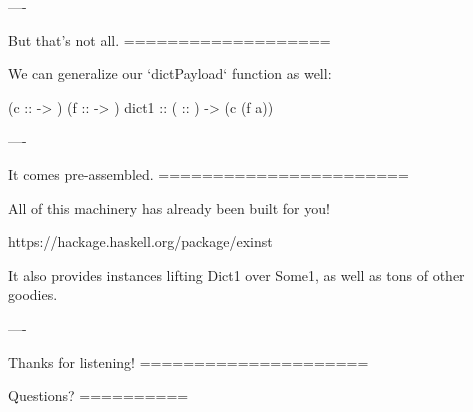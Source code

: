 ----

But that's not all.
===================

We can generalize our `dictPayload` function as well:

\begin{custom}
    (c ::  -> )
              (f ::   -> ) 
    dict1 ::  ( :: ) ->  (c (f a))
\end{custom}

----

It comes pre-assembled.
=======================

All of this machinery has already been built for you!

https://hackage.haskell.org/package/exinst

It also provides instances lifting Dict1 over Some1, as well as tons of other goodies.

----

Thanks for listening!
=====================

Questions?
==========

